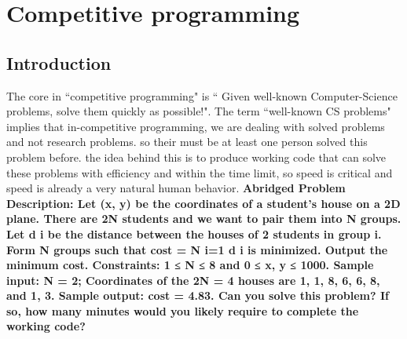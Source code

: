 \chapter{Competitive programming}
\section{Introduction}
The core in ``competitive programming" is `` Given well-known Computer-Science problems, solve them quickly as possible!".
\newline
The term ``well-known CS problems" implies that in-competitive programming, we are dealing with solved problems and not research problems. so their must be at least one person solved this problem before. the idea behind this is to produce working code that can solve these problems with efficiency and within the time limit, so speed is critical and speed is already a very natural human behavior.
\newline
\bf Abridged Problem Description:
\newline
\normalfont 
Let (x, y) be the coordinates of a student's house on a 2D plane. There are 2N students
and we want to pair them into N groups. Let d i be the distance between the houses
of 2 students in group i. Form N groups such that cost = N
i=1 d i is minimized.
Output the minimum cost. Constraints: 1 ≤ N ≤ 8 and 0 ≤ x, y ≤ 1000.
\newline
Sample input:
N = 2; Coordinates of the 2N = 4 houses are {1, 1}, {8, 6}, {6, 8}, and {1, 3}.
\newline
Sample output:
cost = 4.83.
\newline
Can you solve this problem?\newline
If so, how many minutes would you likely require to complete the working code?\newline
